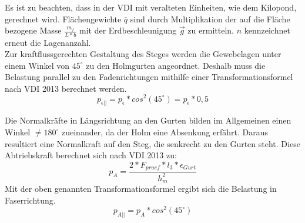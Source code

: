 \noindent Es ist zu beachten, dass in der VDI mit veralteten Einheiten, wie dem Kilopond, gerechnet wird. Flächengewichte $ \bar{q} $ sind durch Multiplikation der auf die Fläche bezogene Masse $ \frac{m_{f}}{L*b} $ mit der Erdbeschleunigung $ \vec{g} $ zu ermitteln. $ n $ kennzeichnet erneut die Lagenanzahl.\\

\noindent Zur kraftflussgerechten Gestaltung des Steges werden die Gewebelagen unter einem Winkel von $ 45^{\circ} $ zu den Holmgurten angeordnet. Deshalb muss die Belastung parallel zu den Fadenrichtungen mithilfe einer Transformationsformel nach VDI 2013 berechnet werden.
\begin{equation}
	p_{\epsilon||}=p_{\epsilon}*cos^{2}\left(45^{\circ} \right)=p_{\epsilon}*0,5 
\end{equation}

Die Normalkräfte in Längsrichtung an den Gurten bilden im Allgemeinen einen Winkel $ \neq180^{\circ} $ zueinander, da der Holm eine Absenkung erfährt. Daraus resultiert eine Normalkraft auf den Steg, die senkrecht zu den Gurten steht. Diese Abtriebskraft berechnet sich nach VDI 2013 zu:
\begin{equation}
	p_{A}=\frac{2*F_{pruef}*l_{3}*\epsilon_{Gurt}}{h_{m}^{2}}
\end{equation}
 Mit der oben genannten Transformationsformel ergibt sich die Belastung in Faserrichtung.
 \begin{equation}
 	p_{A||}=p_{A}*cos^{2}\left(45^{\circ} \right)
 \end{equation} 

